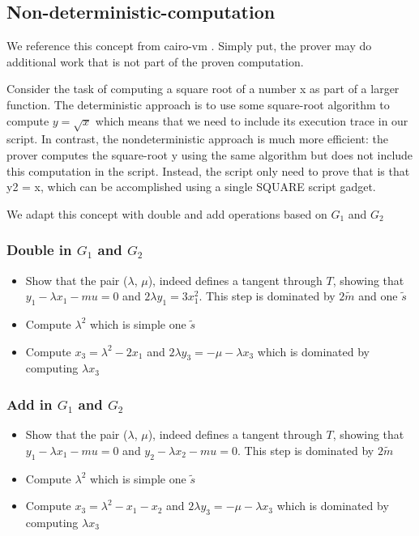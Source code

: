 \subsection{Non-deterministic-computation}

We reference this concept from cairo-vm \cite{website:cairo-vm}. Simply put, the prover
may do additional work that is not part of the proven computation.

Consider the task of computing a square root of a number x as part of a larger function.
The deterministic approach is to use some square-root algorithm to compute $ y = \sqrt{x} $ which means that we need to
include its execution trace in our script. In contrast, the nondeterministic approach
is much more efficient: the prover computes the square-root y using the
same algorithm but does not include this computation in the script. Instead, the script only need to prove that is that y2 = x, which can be accomplished using a single SQUARE script gadget.

We adapt this concept with double and add operations based on $G_1$ and $G_2$

\subsubsection{Double in $G_1$ and $G_2$}

\begin{itemize}
    \item Show that the pair ($\lambda$, $\mu$), indeed defines a tangent through $T$, showing that $\displaystyle y_1 - \lambda x_{1} - mu = 0$ 
    and $\displaystyle 2\lambda y_1 = 3x_1^2$. This step is dominated by $2\tilde{m}$ and one $\tilde{s}$
    \item Compute $\lambda^2$ which is simple one $\tilde{s}$
    \item Compute $\displaystyle x_3 = \lambda^2-2x_1$ and $\displaystyle 2\lambda y_3 = -\mu - \lambda x_3$ which is dominated by computing $\lambda x_3$
\end{itemize}

\subsubsection{Add in $G_1$ and $G_2$}

\begin{itemize}
    \item Show that the pair ($\lambda$, $\mu$), indeed defines a tangent through $T$, showing that $\displaystyle y_1 - \lambda x_{1} - mu = 0$ 
    and $\displaystyle y_2 - \lambda x_{2} - mu = 0$. This step is dominated by $2\tilde{m}$
    \item Compute $\lambda^2$ which is simple one $\tilde{s}$
    \item Compute $\displaystyle x_3 = \lambda^2-x_1-x_2$ and $\displaystyle 2\lambda y_3 = -\mu - \lambda x_3$ which is dominated by computing $\lambda x_3$
\end{itemize}
